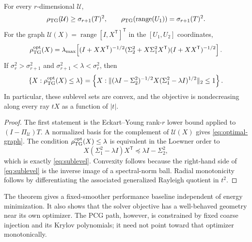 \documentclass[smallextended]{svjour3}
\newcommand{\T}{\mathsf{T}}
\newcommand{\range}{\operatorname{range}}
\newcommand{\cU}{\mathcal{U}}
\newcommand{\norm}[1]{\lVert#1\rVert}
\newcommand{\abs}[1]{\lvert#1\rvert}
\begin{document}
\begin{theorem}\label{thm:solver-optimal}
For every $r$-dimensional $\cU$,
\begin{equation}\label{eq:solver-lower}
 \rho_{\rm TG}(\cU)\ge\sigma_{r+1}(T)^2,
 \qquad \rho_{\rm TG}(\range(U_1))=\sigma_{r+1}(T)^2.
\end{equation}
For the graph $\cU(X)=\range[I,X^\T]^\T$ in the $[U_1,U_2]$ coordinates,
\begin{equation}\label{eq:optimal-graph}
 \rho_{\rm TG}^{\rm opt}(X)=\lambda_{\max}\!\left[
 (I+XX^\T)^{-1/2}(\Sigma_2^2+X\Sigma_1^2X^\T)
 (I+XX^\T)^{-1/2}\right].
\end{equation}
If $\sigma_r^2>\sigma_{r+1}^2$ and
$\sigma_{r+1}^2<\lambda<\sigma_r^2$, then
\begin{equation}\label{eq:sublevel}
 \{X:\rho_{\rm TG}^{\rm opt}(X)\le\lambda\}
 =\left\{X:\norm{(\lambda I-\Sigma_2^2)^{-1/2}
 X(\Sigma_1^2-\lambda I)^{1/2}}_2\le1\right\}.
\end{equation}
In particular, these sublevel sets are convex, and the objective is nondecreasing along every ray $tX$ as a function of $\abs t$.
\end{theorem}
\begin{proof}
The first statement is the Eckart--Young rank-$r$ lower bound applied to
$(I-\Pi_{\cU})T$. A normalized basis for the complement of $\cU(X)$ gives \eqref{eq:optimal-graph}. The condition
$\rho_{\rm TG}^{\rm opt}(X)\le\lambda$ is equivalent in the Loewner order to
\begin{equation*}
 X(\Sigma_1^2-\lambda I)X^\T\preceq\lambda I-\Sigma_2^2,
\end{equation*}
which is exactly \eqref{eq:sublevel}. Convexity follows because the right-hand side of \eqref{eq:sublevel} is the inverse image of a spectral-norm ball. Radial monotonicity follows by differentiating the associated generalized Rayleigh quotient in $t^2$.
\end{proof}

The theorem gives a fixed-smoother performance baseline independent of energy minimization. It also shows that the solver objective has a well-behaved geometry near its own optimizer. The PCG path, however, is constrained by fixed coarse injection and its Krylov polynomials; it need not point toward that optimizer monotonically.
\end{document}
